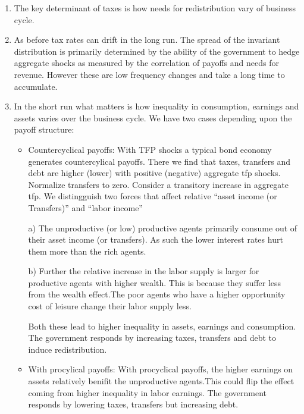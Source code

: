\documentclass[thmsb,11pt]{article}
\begin{document}
\begin{enumerate}

\item The key determinant of taxes is how needs for redistribution vary of business cycle.

\item As before tax rates can drift in the long run. The spread of the invariant distribution is primarily determined by the ability of the government to hedge aggregate shocks as measured by the correlation of payoffs and needs for revenue. However these are low frequency changes and take a long time to accumulate.

\item In the short run what matters is how inequality in consumption, earnings and assets varies over the business cycle. We have two cases depending upon the payoff structure:
\begin{itemize}


\item Countercyclical payoffs:  With TFP shocks  a typical bond economy generates countercylical payoffs. There we find that taxes, transfers and debt are higher (lower) with positive (negative) aggregate tfp shocks. Normalize transfers to zero. Consider a transitory increase in aggregate tfp. We distingguish two forces that affect relative ``asset income (or Transfers)''  and ``labor income''

a) The unproductive (or low) productive agents primarily consume out of their asset income (or transfers). As such the lower interest rates hurt them more than the rich agents. 

b) Further the relative increase in the labor supply is larger for  productive agents with higher wealth. This is because they suffer less from the wealth effect.The poor agents who have a higher opportunity cost of leisure change their labor supply less. 


Both these  lead to higher inequality in assets, earnings and consumption. The government responds by increasing taxes, transfers and debt to induce redistribution.



\item With procylical payoffs:  With procyclical payoffs, the higher earnings on assets relatively benifit the unproductive agents.This could flip the effect coming from higher inequality in labor earnings. The government responds by lowering taxes, transfers but increasing debt.

\end{itemize}
\end{enumerate}
\end{document}
